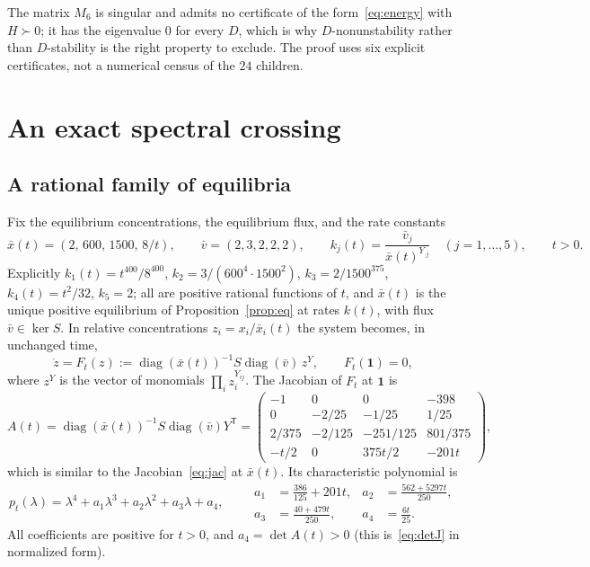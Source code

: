 \documentclass[11pt,a4paper]{article}
\theoremstyle{plain}
\theoremstyle{definition}
\theoremstyle{remark}
\newcommand{\diag}{\operatorname{diag}}
\newcommand{\ones}{\mathbf{1}}
\newcommand{\xbar}{\bar x}
\newcommand{\vbar}{\bar v}
\begin{document}
The matrix $M_6$ is singular and admits no certificate of the form~\eqref{eq:energy} with $H\succ0$; it has the eigenvalue $0$ for every $D$, which is why $D$-nonunstability rather than $D$-stability is the right property to exclude. The proof uses six explicit certificates, not a numerical census of the $24$ children.

\section{An exact spectral crossing}\label{sec:crossing}

\subsection{A rational family of equilibria}

Fix the equilibrium concentrations, the equilibrium flux, and the rate constants
\begin{equation}\label{eq:path}
\xbar(t)=(2,\,600,\,1500,\,8/t),\qquad \vbar=(2,3,2,2,2),\qquad
k_j(t)=\frac{\vbar_j}{\xbar(t)^{Y_{\cdot j}}}\quad(j=1,\dots,5),\qquad t>0 .
\end{equation}
Explicitly $k_1(t)=t^{400}/8^{400}$, $k_2=3/(600^4\cdot1500^2)$, $k_3=2/1500^{375}$, $k_4(t)=t^2/32$, $k_5=2$; all are positive rational functions of $t$, and $\xbar(t)$ is the unique positive equilibrium of Proposition~\ref{prop:eq} at rates $k(t)$, with flux $\vbar\in\ker S$. In relative concentrations $z_i=x_i/\xbar_i(t)$ the system becomes, in unchanged time,
\begin{equation}\label{eq:F}
\dot z=F_t(z):=\diag(\xbar(t))^{-1}S\diag(\vbar)\,z^{Y},\qquad F_t(\ones)=0,
\end{equation}
where $z^Y$ is the vector of monomials $\prod_iz_i^{Y_{ij}}$. The Jacobian of $F_t$ at $\ones$ is
\begin{equation}\label{eq:A}
A(t)=\diag(\xbar(t))^{-1}S\diag(\vbar)Y^{\mathsf T}
=\begin{pmatrix}
-1&0&0&-398\\
0&-2/25&-1/25&1/25\\
2/375&-2/125&-251/125&801/375\\
-t/2&0&375t/2&-201t
\end{pmatrix},
\end{equation}
which is similar to the Jacobian~\eqref{eq:jac} at $\xbar(t)$. Its characteristic polynomial is
\begin{equation}\label{eq:charpoly}
p_t(\lambda)=\lambda^4+a_1\lambda^3+a_2\lambda^2+a_3\lambda+a_4,\qquad
\begin{aligned}
a_1&=\tfrac{386}{125}+201t,&a_2&=\tfrac{562+5297t}{250},\\
a_3&=\tfrac{40+479t}{250},&a_4&=\tfrac{6t}{25}.
\end{aligned}
\end{equation}
All coefficients are positive for $t>0$, and $a_4=\det A(t)>0$ (this is~\eqref{eq:detJ} in normalized form).
\end{document}
